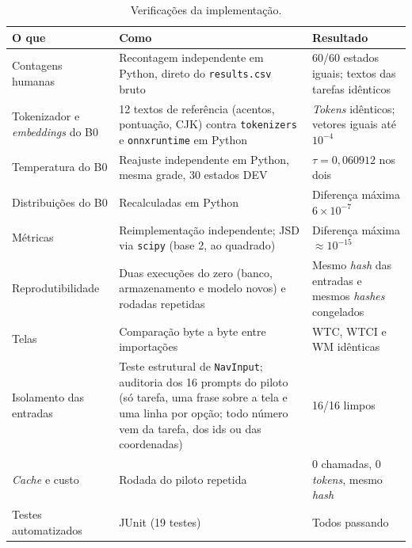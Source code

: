 \documentclass[12pt]{article}
\newcommand{\code}[1]{\texttt{#1}}
\begin{document}
\begin{table}[ht]
\centering
\caption{Verificações da implementação.}
\label{tab:validacao}
\scriptsize
\begin{tabularx}{\textwidth}{@{}p{2.8cm}Yp{3.6cm}@{}}
\toprule
\textbf{O que} & \textbf{Como} & \textbf{Resultado} \\
\midrule
Contagens humanas & Recontagem independente em Python, direto do \code{results.csv} bruto & 60/60 estados iguais; textos das tarefas idênticos \\
Tokenizador e \textit{embeddings} do B0 & 12 textos de referência (acentos, pontuação, CJK) contra \code{tokenizers} e \code{onnxruntime} em Python & \textit{Tokens} idênticos; vetores iguais até $10^{-4}$ \\
Temperatura do B0 & Reajuste independente em Python, mesma grade, 30 estados DEV & $\tau=0{,}060912$ nos dois \\
Distribuições do B0 & Recalculadas em Python & Diferença máxima $6\times10^{-7}$ \\
Métricas & Reimplementação independente; JSD via \code{scipy} (base 2, ao quadrado) & Diferença máxima $\approx10^{-15}$ \\
Reprodutibilidade & Duas execuções do zero (banco, armazenamento e modelo novos) e rodadas repetidas & Mesmo \textit{hash} das entradas e mesmos \textit{hashes} congelados \\
Telas & Comparação byte a byte entre importações & WTC, WTCI e WM idênticas \\
Isolamento das entradas & Teste estrutural de \code{NavInput}; auditoria dos 16 prompts do piloto (só tarefa, uma frase sobre a tela e uma linha por opção; todo número vem da tarefa, dos ids ou das coordenadas) & 16/16 limpos \\
\textit{Cache} e custo & Rodada do piloto repetida & 0 chamadas, 0 \textit{tokens}, mesmo \textit{hash} \\
Testes automatizados & JUnit (19 testes) & Todos passando \\
\bottomrule
\end{tabularx}
\end{table}
\end{document}

